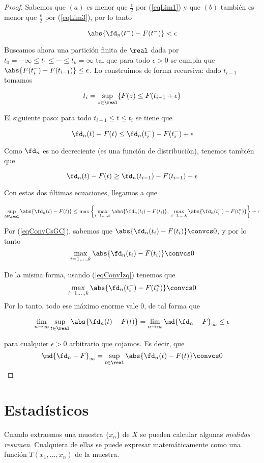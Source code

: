 \documentclass{apuntes}
\begin{document}
\begin{proof}
Sabemos que $(a)$ es menor que $\frac{\epsilon}{2}$ por (\ref{eqLim1}) y que $(b)$ también es menor que $\frac{\epsilon}{2}$ por (\ref{eqLim3}), por lo tanto

\[ \abs{\fd_n(t^-) - F(t^-)}  < \epsilon \]

Buscamos ahora una partición finita de $\real$ dada por $t_0 = -\infty \leq t_1 \leq \dotsb \leq t_k = \infty$ tal que para todo $\epsilon > 0$ se cumpla que $\abs{F(t_i^-) - F(t_{i-1})} \leq \epsilon$. Lo construimos de forma recursiva: dado $t_{i-1}$ tomamos

\[ t_i =\sup_{z\in\real} \{ F(z) \leq F(t_{i-1} + \epsilon \} \]

El siguiente paso: para todo $t_{i-1} \leq t \leq t_i$ se tiene que

\[ \fd_n(t) - F(t) \leq \fd_n(t_i^-) - F(t_i^-) + \epsilon \]

Como $\fd_n $ es no decreciente (es una función de distribución), tenemos también que

\[ \fd_n(t) - F(t) \geq \fd_n(t_{i-1}) - F(t_{i-1}) - \epsilon \]

Con estas dos últimas ecuaciones, llegamos a que

\[ \sup_{t\in\real} \abs{\fd_n(t) - F(t)} \leq \max\left\lbrace \max_{i=1,\dotsc ,k} \abs{\fd_n(t_i) - F(t_i)},\; \max_{i=1,\dotsc ,k} \abs{\fd_n(t_i^-) - F(t_i^n)} \right\rbrace + \epsilon \]

Por (\ref{eqConvCsGC}), sabemos que $\abs{\fd_n(t_i) - F(t_i)} \convcs 0$, y por lo tanto \[ \max_{i=1,\dotsc ,k} \abs{\fd_n(t_i) - F(t_i)} \convcs 0 \]

De la misma forma, usando (\ref{eqConvIzq}) tenemos que \[ \max_{i=1,\dotsc ,k} \abs{\fd_n(t_i^-) - F(t_i^n)} \convcs 0 \]
Por lo tanto, todo ese máximo enorme vale 0, de tal forma que

\[ \lim_{n\to\infty} \sup_{t\in\real} \abs{\fd_n(t) - F(t)}  =  \lim_{n\to\infty} \md{\fd_n - F}_\infty \leq \epsilon \]

para cualquier $\epsilon > 0$ arbitrario que cojamos. Es decir, que \[ \md{\fd_n - F}_\infty=\sup_{t\in\real} \abs{\fd_n(t) - F(t)} \convcs 0 \]
\end{proof}

\newpage
\section{Estadísticos}

Cuando extraemos una muestra $\{x_n\}$ de $X$ se pueden calcular algunas \textit{medidas resumen}. Cualquiera de ellas se puede expresar matemáticamente como una función $T(x_1,\dotsc,x_n)$ de la muestra.
\end{document}
